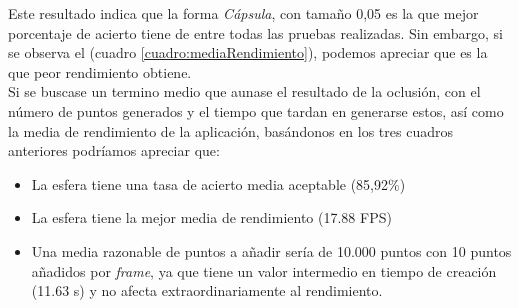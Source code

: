 \begin{table}[ht]
\centering
{}
\caption{Distintas formas para general la oclusión y tamaños con sus correspondientes porcentajes de acierto. }
\label{cuadro:javicabronque has copiado la referencia y no me iba}
\end{table}

Este resultado indica que la forma \textit{Cápsula}, con tamaño 0,05 es la que mejor porcentaje de acierto tiene de entre todas las pruebas realizadas. Sin embargo, si se observa el (cuadro \ref{cuadro:mediaRendimiento}), podemos apreciar que es la que peor rendimiento obtiene.\\

Si se buscase un termino medio que aunase el resultado de la oclusión, con el número de puntos generados y el tiempo que tardan en generarse estos, así como la media de rendimiento de la aplicación, basándonos en los tres cuadros anteriores podríamos apreciar que:

\begin{itemize}
         \item La esfera tiene una tasa de acierto media aceptable (85,92\%)
         \item La esfera tiene la mejor media de rendimiento (17.88 FPS)
         \item Una media razonable de puntos a añadir sería de 10.000 puntos con 10 puntos añadidos por \textit{frame}, ya que tiene un valor intermedio en tiempo de creación (11.63 s) y no afecta extraordinariamente al rendimiento.
\end{itemize}